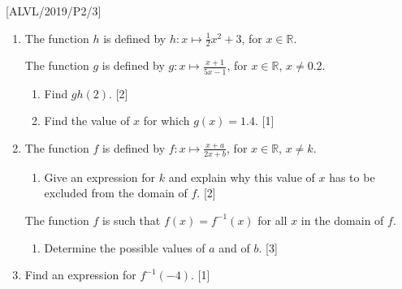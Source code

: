 \item {[}ALVL/2019/P2/3{]} 
\begin{enumerate}
\item The function $h$ is defined by $h:x\mapsto\frac{1}{2}x^{2}+3$, for
$x\in\mathbb{R}$.

The function $g$ is defined by $g:x\mapsto\frac{x+1}{5x-1}$, for
$x\in\mathbb{R}$, $x\neq0.2$. 
\begin{enumerate}
\item Find $gh(2)$. \hfill{} {[}2{]}
\item Find the value of $x$ for which $g\left(x\right)=1.4$. \hfill{}
{[}1{]}
\end{enumerate}
\item The function $f$ is defined by $f:x\mapsto\frac{x+a}{2x+b}$, for
$x\in\mathbb{R}$, $x\ne k$. 
\begin{enumerate}
\item Give an expression for $k$ and explain why this value of $x$ has
to be excluded from the domain of $f$. \hfill{}{[}2{]}
\end{enumerate}
The function $f$ is such that $f\left(x\right)=f^{-1}\left(x\right)$
for all $x$ in the domain of $f$. 
\begin{enumerate}
\item Determine the possible values of $a$ and of $b$. \hfill{}{[}3{]}
\end{enumerate}
\item Find an expression for $f^{-1}(-4)$. \hfill{}{[}1{]}
\end{enumerate}
